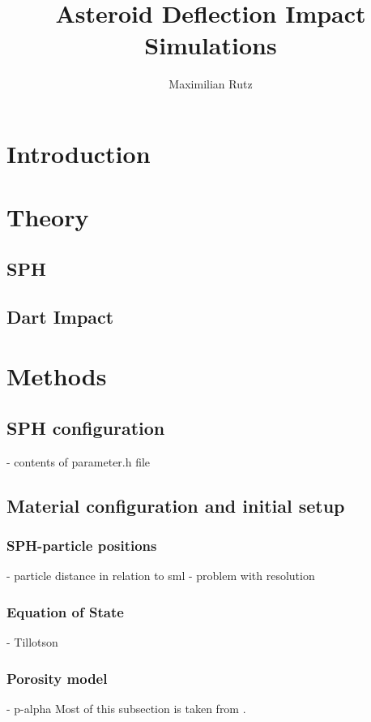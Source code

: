 \documentclass{article}
\title{Asteroid Deflection Impact Simulations}
\author{Maximilian Rutz}
\date{}
\begin{document}
	\maketitle
	\begin{abstract}
	 
	\end{abstract}
	
	\newpage
	\tableofcontents
	 
	\newpage
	\section{Introduction} 
	\section{Theory}
		\subsection{SPH}
		\subsection{Dart Impact}
	\section{Methods}
		\subsection{SPH configuration}
		- contents of parameter.h file
		\subsection{Material configuration and initial setup}
			\subsubsection{SPH-particle positions}
			- particle distance in relation to sml
			- problem with resolution
			\subsubsection{Equation of State}
			- Tillotson
			\subsubsection{Porosity model}	
			- p-alpha		
			Most of this subsection is taken from \cite{Jutzi_p_alpha_1}.
\end{document}

